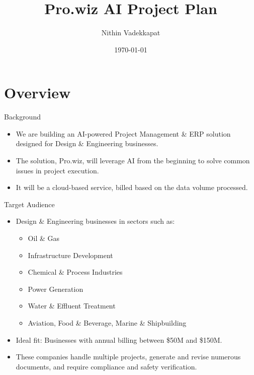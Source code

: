 \documentclass{beamer}
\title{Pro.wiz AI Project Plan}
\author{Nithin Vadekkapat}
\institute{DhvaniAI}
\date{\today}
\begin{document}
\begin{frame}
    \titlepage
\end{frame}

\section{Overview}
\begin{frame}
    \sectionpage
\end{frame}

\begin{frame}{Background}
    \begin{itemize}
        \item We are building an AI-powered Project Management \& ERP solution designed for Design \& Engineering businesses.
        \item The solution, Pro.wiz, will leverage AI from the beginning to solve common issues in project execution.
        \item It will be a cloud-based service, billed based on the data volume processed.
    \end{itemize}
\end{frame}

\begin{frame}{Target Audience}
    \begin{itemize}
        \item Design \& Engineering businesses in sectors such as:
        \begin{itemize}
            \item Oil \& Gas
            \item Infrastructure Development
            \item Chemical \& Process Industries
            \item Power Generation
            \item Water \& Effluent Treatment
            \item Aviation, Food \& Beverage, Marine \& Shipbuilding
        \end{itemize}
        \item Ideal fit: Businesses with annual billing between \$50M and \$150M.
        \item These companies handle multiple projects, generate and revise numerous documents, and require compliance and safety verification.
    \end{itemize}
\end{frame}
\end{document}
